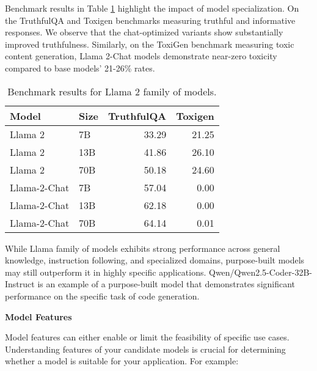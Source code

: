 Benchmark results  in Table \ref{tab:llama2_benchmark} highlight the impact of model specialization. On the TruthfulQA  and Toxigen  benchmarks measuring truthful and informative responses. We observe that the chat-optimized variants show substantially improved truthfulness. Similarly, on the ToxiGen benchmark measuring toxic content generation, Llama 2-Chat models demonstrate near-zero toxicity compared to base models' 21-26\% rates.
\begin{table}[H]
\centering
\caption{Benchmark results for Llama 2 family of models.}
\label{tab:llama2_benchmark}
\begin{tabular}{llrr}
\hline
Model & Size & TruthfulQA & Toxigen \\
\hline
Llama 2 & 7B & 33.29 & 21.25 \\
Llama 2 & 13B & 41.86 & 26.10 \\
Llama 2 & 70B & 50.18 & 24.60 \\
Llama-2-Chat & 7B & 57.04 & 0.00 \\
Llama-2-Chat & 13B & 62.18 & 0.00 \\
Llama-2-Chat & 70B & 64.14 & 0.01 \\
\hline
\end{tabular}
\end{table}

While Llama family of models exhibits strong performance across general knowledge, instruction following, and specialized domains, purpose-built models may still outperform it in highly specific applications. Qwen/Qwen2.5-Coder-32B-Instruct \cite{hui2024qwen2} is an example of a purpose-built model that demonstrates significant performance on the specific task of code generation.

\textbf{Model Features}

Model features can either enable or limit the feasibility of specific use cases. Understanding features of your candidate models is crucial for determining whether a model is suitable for your application. For example:

